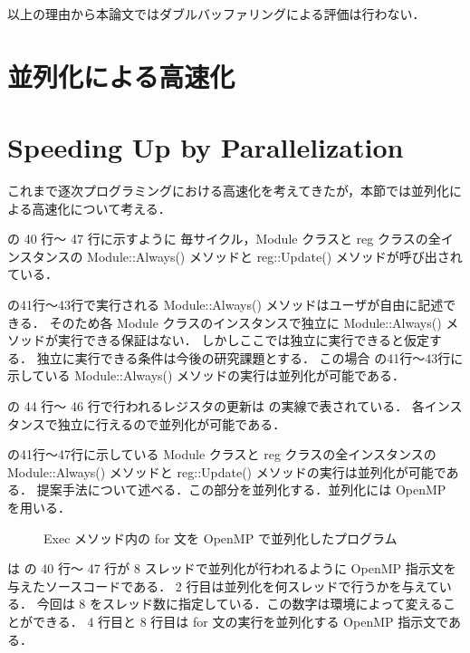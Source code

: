 以上の理由から本論文ではダブルバッファリングによる評価は行わない．

\fi

\section{並列化による高速化} \label{ss:parallel}
\fi
\section{Speeding Up by Parallelization} \label{ss:parallel}

これまで逐次プログラミングにおける高速化を考えてきたが，本節では並列化による高速化について考える．

 の 40 行〜 47 行に示すように
毎サイクル，Module クラスと reg クラスの全インスタンスの Module::Always() メソッドと reg::Update() メソッドが呼び出されている．

 の41行〜43行で実行される Module::Always() メソッドはユーザが自由に記述できる．
そのため各 Module クラスのインスタンスで独立に Module::Always() メソッドが実行できる保証はない．
しかしここでは独立に実行できると仮定する．
独立に実行できる条件は今後の研究課題とする．
この場合 の41行〜43行に示している Module::Always() メソッドの実行は並列化が可能である．

 の 44 行〜 46 行で行われるレジスタの更新は の実線で表されている．
各インスタンスで独立に行えるので並列化が可能である．

 の41行〜47行に示している Module クラスと reg クラスの全インスタンスの Module::Always() メソッドと reg::Update() メソッドの実行は並列化が可能である．
提案手法について述べる．この部分を並列化する．並列化には OpenMP~\cite{openmp} を用いる．

\begin{figure}[t]
 
 \caption{Exec メソッド内の for 文を OpenMP で並列化したプログラム}
 \label{src:exec_openmp}
\end{figure}

 は の 40 行〜 47 行が 8 スレッドで並列化が行われるように OpenMP 指示文を与えたソースコードである．
2 行目は並列化を何スレッドで行うかを与えている．
今回は 8 をスレッド数に指定している．この数字は環境によって変えることができる．
4 行目と 8 行目は for 文の実行を並列化する OpenMP 指示文である．

